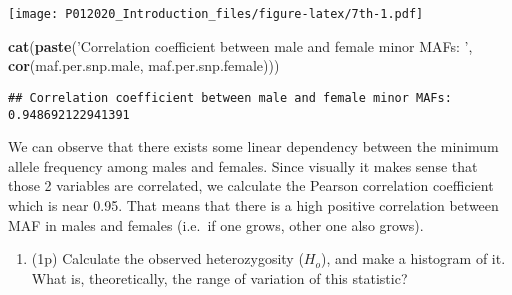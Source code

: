 \documentclass[
]{article}
\newenvironment{Shaded}{\begin{snugshade}}{\end{snugshade}}
\newcommand{\CommentTok}[1]{\textcolor[rgb]{0.56,0.35,0.01}{\textit{#1}}}
\newcommand{\ControlFlowTok}[1]{\textcolor[rgb]{0.13,0.29,0.53}{\textbf{#1}}}
\newcommand{\DataTypeTok}[1]{\textcolor[rgb]{0.13,0.29,0.53}{#1}}
\newcommand{\DecValTok}[1]{\textcolor[rgb]{0.00,0.00,0.81}{#1}}
\newcommand{\FloatTok}[1]{\textcolor[rgb]{0.00,0.00,0.81}{#1}}
\newcommand{\KeywordTok}[1]{\textcolor[rgb]{0.13,0.29,0.53}{\textbf{#1}}}
\newcommand{\NormalTok}[1]{#1}
\newcommand{\OperatorTok}[1]{\textcolor[rgb]{0.81,0.36,0.00}{\textbf{#1}}}
\newcommand{\StringTok}[1]{\textcolor[rgb]{0.31,0.60,0.02}{#1}}
\providecommand{\tightlist}{%
  \setlength{\itemsep}{0pt}\setlength{\parskip}{0pt}}
\begin{document}
\texttt{[image: P012020\_Introduction\_files/figure-latex/7th-1.pdf]}

\begin{Shaded}
\begin{Highlighting}[]
\KeywordTok{cat}\NormalTok{(}\KeywordTok{paste}\NormalTok{(}\StringTok{'Correlation coefficient between male and female minor MAFs: '}\NormalTok{, }\KeywordTok{cor}\NormalTok{(maf.per.snp.male, maf.per.snp.female)))}
\end{Highlighting}
\end{Shaded}

\begin{verbatim}
## Correlation coefficient between male and female minor MAFs:  0.948692122941391
\end{verbatim}

We can observe that there exists some linear dependency between the
minimum allele frequency among males and females. Since visually it
makes sense that those 2 variables are correlated, we calculate the
Pearson correlation coefficient which is near 0.95. That means that
there is a high positive correlation between MAF in males and females
(i.e.~if one grows, other one also grows).

\begin{enumerate}
\def\labelenumi{\arabic{enumi}.}
\setcounter{enumi}{7}
\tightlist
\item
  (1p) Calculate the observed heterozygosity (\(H_o\)), and make a
  histogram of it. What is, theoretically, the range of variation of
  this statistic?
\end{enumerate}

\begin{Shaded}
\end{Shaded}
\end{document}
